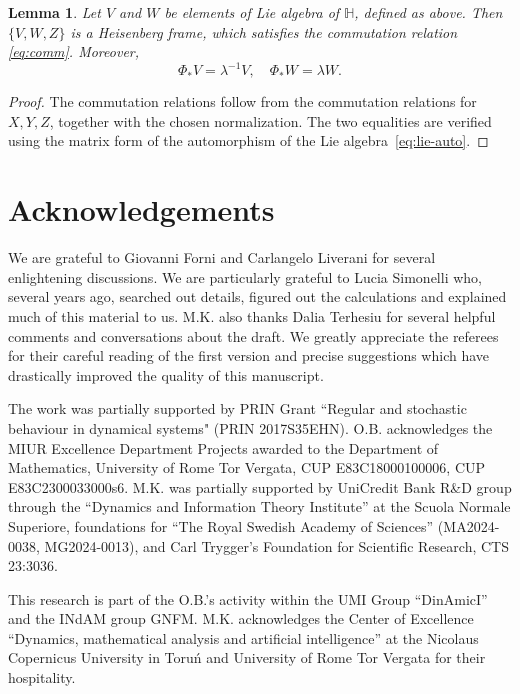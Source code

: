 \documentclass[a4paper,11pt]{amsart}
\newtheorem{lemma}[theorem]{Lemma}
\theoremstyle{remark}
\newcommand{\bH}{\mathbb{H}} %
\begin{document}
\begin{lemma}
    Let \(V\) and \(W\) be elements of Lie algebra of $\bH$, defined as above.
    Then \(\{V, W, Z \}\) is a Heisenberg frame, which satisfies the commutation relation \eqref{eq:comm}.
    Moreover,
    \[
        \Phi_{*} V = \lambda^{-1} V,
        \quad
        \Phi_{*} W = \lambda W.
    \]
\end{lemma}
\begin{proof}
    The commutation relations follow from the commutation relations for \(X,Y,Z\), together with the chosen normalization.
    The two equalities are verified using the matrix form  of the automorphism of the Lie algebra~\eqref{eq:lie-auto}.
\end{proof}


\section*{Acknowledgements}

\begin{small}
    We are grateful to Giovanni Forni and Carlangelo Liverani for several enlightening discussions.
    We are particularly grateful to Lucia Simonelli who, several years ago, searched out details, figured out the calculations and explained much of this material to us. 
    M.K. also thanks Dalia Terhesiu for several helpful comments and conversations about the draft.
    We greatly appreciate the referees for their careful reading of the first version and precise suggestions which have drastically improved the quality of this manuscript.

    The work was partially supported by PRIN Grant ``Regular and stochastic behaviour in dynamical systems" (PRIN 2017S35EHN).
    O.B. acknowledges the MIUR Excellence Department Projects awarded to the Department of Mathematics, University of Rome Tor Vergata, CUP E83C18000100006, CUP E83C2300033000s6.
    M.K. was partially supported by UniCredit Bank R\&D group through the ``Dynamics and Information Theory Institute'' at the Scuola Normale Superiore, foundations for ``The Royal Swedish Academy of Sciences'' (MA2024-0038, MG2024-0013), and Carl Trygger's Foundation for Scientific Research, CTS 23:3036.

    This research is part of the O.B.'s activity within the UMI
    Group ``DinAmicI'' and the INdAM group GNFM. 
    M.K. acknowledges the Center of Excellence ``Dynamics, mathematical analysis and artificial intelligence'' at the Nicolaus Copernicus University in Toruń and University of Rome Tor Vergata for their hospitality.
\end{small}
\end{document}
